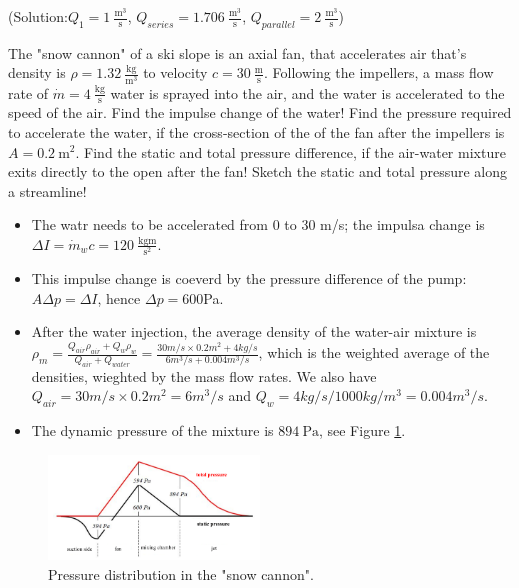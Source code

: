 (Solution:$Q_1 = 1~\frac{\mathrm{m^3}}{\mathrm{s}}$, $Q_{series} = 1.706~\frac{\mathrm{m^3}}{\mathrm{s}}$, $Q_{parallel} = 2~\frac{\mathrm{m^3}}{\mathrm{s}}$)

\vspace{1cm}
\begin{tcolorbox}

The "snow cannon" of a ski slope is an axial fan, that accelerates air that's density is $\rho = 1.32~\frac{\mathrm{kg}}{\mathrm{m^3}}$ to velocity $c=30~\frac{\mathrm{m}}{\mathrm{s}}$. Following the impellers, a mass flow rate of $\dot{m}=4~\frac{\mathrm{kg}}{\mathrm{s}}$ water is sprayed into the air, and the water is accelerated to the speed of the air. Find the impulse change of the water! Find the pressure required to accelerate the water, if the cross-section of the of the fan after the impellers is $A=0.2~\mathrm{m^2}$. Find the static and total pressure difference, if the air-water mixture exits directly to the open after the fan! Sketch the static and total pressure along a streamline!

\begin{itemize}
%
\item The watr needs to be accelerated from 0 to 30 m/s; the impulsa change is $\Delta I = \dot{m}_w c=120~\frac{\mathrm{kg m}}{\mathrm{s^2}}$.
%
\item This impulse change is coeverd by the pressure difference of the pump: $A\Delta p=\Delta I$, hence $\Delta p=600$Pa.
%
\item After the water injection, the average density of the water-air mixture is $\rho_m=\frac{Q_{air}\rho_{air}+Q_w\rho_w}{Q_{air}+Q_{water}}=\frac{30 m/s\times 0.2m^2+4kg/s}{6m^3/s+0.004 m^3/s}$, which is the weighted average of the densities, wieghted by the mass flow rates. We also have $Q_{air}=30 m/s\times 0.2m^2=6m^3/s$ and $Q_w=4kg/s/1000 kg/m^3=0.004m^3/s$.
%
 \item The dynamic pressure of the mixture is $894~\mathrm{Pa}$, see Figure \ref{fig:snow_cannon}.
\end{itemize}
\end{tcolorbox}

\begin{figure}[!ht]
\centering
\includegraphics[width = 0.5\textwidth]{Problem_solving/figs/snow-cannon.png}
\caption{\label{fig:snow_cannon} Pressure distribution in the "snow cannon".}
\end{figure}

